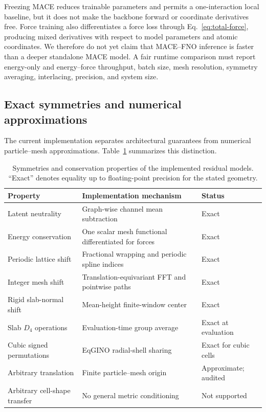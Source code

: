 \documentclass[11pt]{article}
\begin{document}
Freezing MACE reduces trainable parameters and permits a one-interaction local
baseline, but it does not make the backbone forward or coordinate derivatives
free. Force training also differentiates a force loss through
Eq.~\eqref{eq:total-force}, producing mixed derivatives with respect to model
parameters and atomic coordinates. We therefore do not yet claim that
MACE--FNO inference is faster than a deeper standalone MACE model. A fair
runtime comparison must report energy-only and energy--force throughput,
batch size, mesh resolution, symmetry averaging, interlacing, precision, and
system size.

\clearpage
\subsection{Exact symmetries and numerical approximations}

The current implementation separates architectural guarantees from numerical
particle--mesh approximations. Table~\ref{tab:symmetry-status} summarizes this
distinction.

\begin{table}[h!]
\centering
\caption{Symmetries and conservation properties of the implemented residual
models. ``Exact'' denotes equality up to floating-point precision for the
stated geometry.}
\label{tab:symmetry-status}
\small
\begin{tabularx}{\textwidth}{>{\raggedright\arraybackslash}p{31mm}
>{\raggedright\arraybackslash}X>{\raggedright\arraybackslash}p{29mm}}
\toprule
Property & Implementation mechanism & Status\\
\midrule
Latent neutrality & Graph-wise channel mean subtraction & Exact\\
Energy conservation & One scalar mesh functional differentiated for forces & Exact\\
Periodic lattice shift & Fractional wrapping and periodic spline indices & Exact\\
Integer mesh shift & Translation-equivariant FFT and pointwise paths & Exact\\
Rigid slab-normal shift & Mean-height finite-window center & Exact\\
Slab \(D_4\) operations & Evaluation-time group average & Exact at evaluation\\
Cubic signed permutations & EqGINO radial-shell sharing & Exact for cubic cells\\
Arbitrary translation & Finite particle--mesh origin & Approximate; audited\\
Arbitrary cell-shape transfer & No general metric conditioning & Not supported\\
\bottomrule
\end{tabularx}
\end{table}
\end{document}
